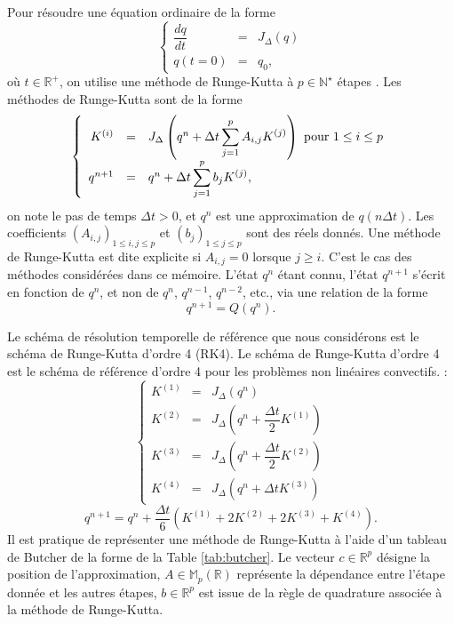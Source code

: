 Pour résoudre une équation ordinaire de la forme 
\begin{equation}
\left\lbrace
\begin{array}{rcl}
\dfrac{dq}{dt} & = & J_{\Delta}(q) \\
q(t=0) & = & q_0,
\end{array}
\right.
\end{equation}
où $t \in \mathbb{R}^+$, on utilise une méthode de Runge-Kutta à $p \in \mathbb{N}^{\star}$ étapes \cite{Butcher2016, Demailly2016}. Les méthodes de Runge-Kutta sont de la forme
\begin{equation}
\left\lbrace
\begin{array}{rcl}
K^{(i)} & = & J_{\Delta} \left( q^n + \Delta t \displaystyle\sum\limits_{j=1}^p A_{i,j} K^{(j)} \right) \text{ pour } 1 \leq i \leq p \\
q^{n+1} & = & q^n + \Delta t \displaystyle\sum\limits_{j=1}^p b_j K^{(j)},
\end{array}
\right.
\end{equation}
on note le pas de temps $\Delta t>0$, et $q^n$ est une approximation de $q(n \Delta t)$. Les coefficients $(A_{i,j})_{1 \leq i,j \leq p}$ et $(b_j)_{1 \leq j \leq p}$ sont des réels donnés. Une méthode de Runge-Kutta est dite explicite si $A_{i,j} = 0$ lorsque $j \geq i$. C'est le cas des méthodes considérées dans ce mémoire. L'état $q^n$ étant connu, l'état $q^{n+1}$ s'écrit en fonction de $q^n$, et non de $q^n$, $q^{n-1}$, $q^{n-2}$, etc., via une relation de la forme
\begin{equation}
q^{n+1} = Q(q^n).
\label{eq:recurrence_rk}
\end{equation}

Le schéma de résolution temporelle de référence que nous considérons est le schéma de Runge-Kutta d'ordre 4 (RK4). 
Le schéma de Runge-Kutta d'ordre 4 est le schéma de référence d'ordre 4 pour les problèmes non linéaires convectifs. :
\begin{equation}
\left\lbrace
\begin{array}{rcl}
K^{(1)} & = & J_{\Delta}(q^n) \\
K^{(2)} & = & J_{\Delta}\left(q^n + \dfrac{\Delta t}{2} K^{(1)}\right) \\
K^{(3)} & = & J_{\Delta}\left(q^n + \dfrac{\Delta t}{2} K^{(2)}\right) \\
K^{(4)} & = & J_{\Delta}\left(q^n + \Delta t K^{(3)}\right)
\end{array}
\right.
\label{eq:k_rk4}
\end{equation}
\begin{equation}
q^{n+1} = q^n + \dfrac{\Delta t}{6} \left( K^{(1)} + 2 K^{(2)} + 2 K^{(3)} + K^{(4)} \right).
\label{eq:assemblage_rk4}
\end{equation}
Il est pratique de représenter une méthode de Runge-Kutta à l'aide d'un tableau de Butcher \cite{Butcher2016} de la forme de la Table \ref{tab:butcher}. Le vecteur $c \in \mathbb{R}^p$ désigne la position de l'approximation, $A \in \mathbb{M}_p(\mathbb{R})$ représente la dépendance entre l'étape donnée et les autres étapes, $b \in \mathbb{R}^p$ est issue de la règle de quadrature associée à la méthode de Runge-Kutta.

